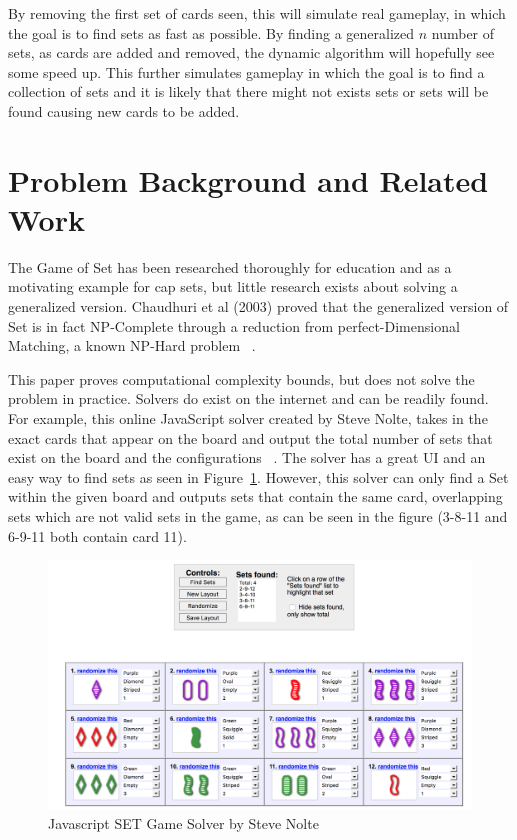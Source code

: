 \documentclass[pageno]{jpaper}
\begin{document}
By removing the first set of cards seen, this will simulate real gameplay, in which the goal is to find sets as fast as possible. By finding a generalized $n$ number of sets, as cards are added and removed, the dynamic algorithm will hopefully see some speed up. This further simulates gameplay in which the goal is to find a collection of sets and it is likely that there might not exists sets or sets will be found causing new cards to be added. 



\section{Problem Background and Related Work}


The Game of Set has been researched thoroughly for education and as a motivating example for cap sets, but little research exists about solving a generalized version. Chaudhuri et al (2003) proved that the generalized version of Set is in fact NP-Complete through a reduction from perfect-Dimensional Matching, a known NP-Hard problem ~\cite{chaudhuri}.  

This paper proves computational complexity bounds, but does not solve the problem in practice. Solvers do exist on the internet and can be readily found. For example, this online JavaScript solver created by Steve Nolte, takes in the exact cards that appear on the board and output the total number of sets that exist on the board and the configurations ~\cite{nolte}. The solver has a great UI and an easy way to find sets as seen in Figure~\ref{fig:nolteUI}. However, this solver can only find a Set within the given board and outputs sets that contain the same card, overlapping sets which are not valid sets in the game, as can be seen in the figure (3-8-11 and 6-9-11 both contain card 11). 

\begin{figure}[htbb]
\centering
\begin{minipage}[b]{.75\linewidth}
\includegraphics[width=\linewidth]{nolte.png}
\caption{Javascript SET Game Solver by Steve Nolte}
\label{fig:nolteUI}
\end{minipage}
\end{figure}
\end{document}
